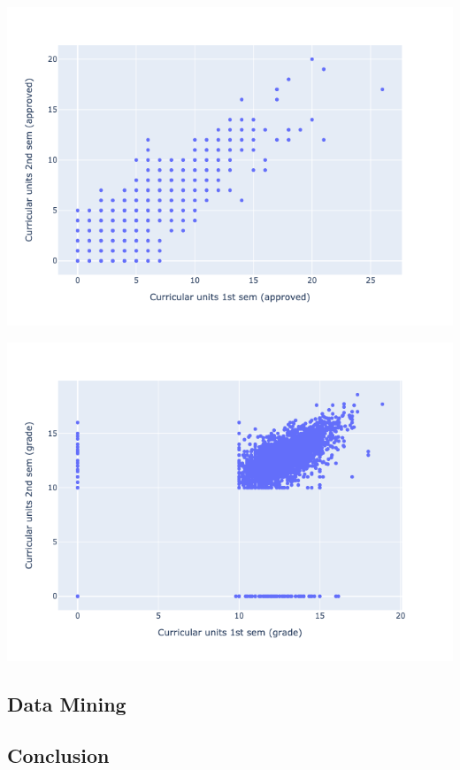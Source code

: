\documentclass[
  letterpaper,
  DIV=11,
  numbers=noendperiod]{scrartcl}
\begin{document}
\includegraphics{report_AzadhdhinNedalYunisAlFraijat_files/figure-pdf/cell-53-output-1.png}

\includegraphics{report_AzadhdhinNedalYunisAlFraijat_files/figure-pdf/cell-54-output-1.png}

\hypertarget{data-mining}{%
\subsection{Data Mining}\label{data-mining}}

\hypertarget{conclusion}{%
\subsection{\texorpdfstring{\textbf{Conclusion}}{Conclusion}}\label{conclusion}}
\end{document}
